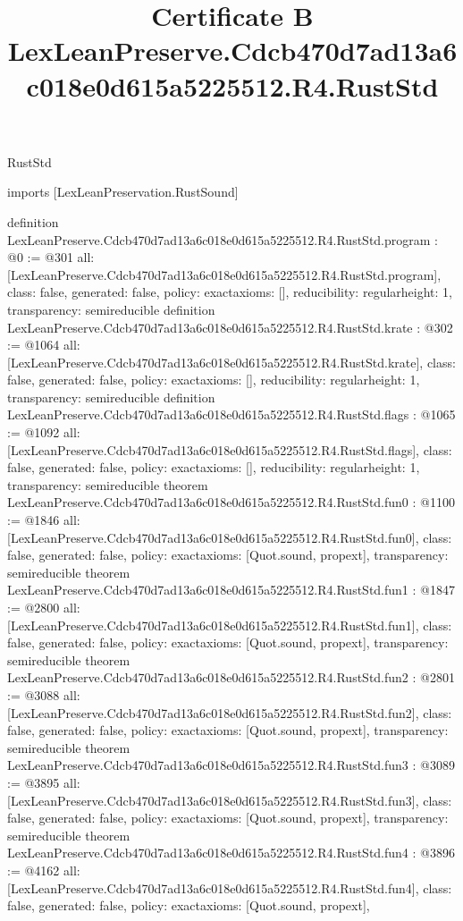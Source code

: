 \begin{lexlean}{RustStd}
\title{Certificate B LexLeanPreserve.Cdcb470d7ad13a6c018e0d615a5225512.R4.RustStd}
\begin{coremodule}
imports [LexLeanPreservation.RustSound]

definition LexLeanPreserve.Cdcb470d7ad13a6c018e0d615a5225512.R4.RustStd.program : @0 := @301 {
  all: [LexLeanPreserve.Cdcb470d7ad13a6c018e0d615a5225512.R4.RustStd.program],
  class: false,
  generated: false,
  policy: exact{axioms: []},
  reducibility: regular{height: 1},
  transparency: semireducible
}
definition LexLeanPreserve.Cdcb470d7ad13a6c018e0d615a5225512.R4.RustStd.krate : @302 := @1064 {
  all: [LexLeanPreserve.Cdcb470d7ad13a6c018e0d615a5225512.R4.RustStd.krate],
  class: false,
  generated: false,
  policy: exact{axioms: []},
  reducibility: regular{height: 1},
  transparency: semireducible
}
definition LexLeanPreserve.Cdcb470d7ad13a6c018e0d615a5225512.R4.RustStd.flags : @1065 := @1092 {
  all: [LexLeanPreserve.Cdcb470d7ad13a6c018e0d615a5225512.R4.RustStd.flags],
  class: false,
  generated: false,
  policy: exact{axioms: []},
  reducibility: regular{height: 1},
  transparency: semireducible
}
theorem LexLeanPreserve.Cdcb470d7ad13a6c018e0d615a5225512.R4.RustStd.fun0 : @1100 := @1846 {
  all: [LexLeanPreserve.Cdcb470d7ad13a6c018e0d615a5225512.R4.RustStd.fun0],
  class: false,
  generated: false,
  policy: exact{axioms: [Quot.sound, propext]},
  transparency: semireducible
}
theorem LexLeanPreserve.Cdcb470d7ad13a6c018e0d615a5225512.R4.RustStd.fun1 : @1847 := @2800 {
  all: [LexLeanPreserve.Cdcb470d7ad13a6c018e0d615a5225512.R4.RustStd.fun1],
  class: false,
  generated: false,
  policy: exact{axioms: [Quot.sound, propext]},
  transparency: semireducible
}
theorem LexLeanPreserve.Cdcb470d7ad13a6c018e0d615a5225512.R4.RustStd.fun2 : @2801 := @3088 {
  all: [LexLeanPreserve.Cdcb470d7ad13a6c018e0d615a5225512.R4.RustStd.fun2],
  class: false,
  generated: false,
  policy: exact{axioms: [Quot.sound, propext]},
  transparency: semireducible
}
theorem LexLeanPreserve.Cdcb470d7ad13a6c018e0d615a5225512.R4.RustStd.fun3 : @3089 := @3895 {
  all: [LexLeanPreserve.Cdcb470d7ad13a6c018e0d615a5225512.R4.RustStd.fun3],
  class: false,
  generated: false,
  policy: exact{axioms: [Quot.sound, propext]},
  transparency: semireducible
}
theorem LexLeanPreserve.Cdcb470d7ad13a6c018e0d615a5225512.R4.RustStd.fun4 : @3896 := @4162 {
  all: [LexLeanPreserve.Cdcb470d7ad13a6c018e0d615a5225512.R4.RustStd.fun4],
  class: false,
  generated: false,
  policy: exact{axioms: [Quot.sound, propext]},
}
\end{coremodule}
\end{lexlean}
